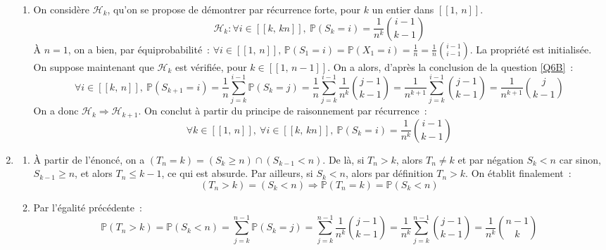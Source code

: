 \documentclass{article}
\newcommand{\prob}{\mathbb{P}}
\begin{document}
\begin{enumerate}[resume]
\begin{enumerate}
      \item On considère $\mathcal{H}_k$, qu'on se propose de démontrer par récurrence forte, pour $k$ un entier dans $[\![1,\, n]\!]$.
      \[
        \mathcal{H}_k \colon \forall i \in [\![k,\, kn]\!],\ \prob(S_k = i) = \frac{1}{n^k}{i - 1 \choose k - 1}
      \]
      À $n = 1$, on a bien, par équiprobabilité~: $\forall i \in [\![1,\, n]\!],\, \prob(S_1 = i) = \prob(X_1 = i) = \frac{1}{n} = \frac{1}{n} {i - 1 \choose i - 1}$. La propriété est initialisée. On suppose maintenant que $\mathcal{H}_k$ est vérifiée, pour $k \in [\![1,\, n-1]\!]$. On a alors, d'après la conclusion de la question \ref{Q6B}~:
      \[
       \forall i \in [\![k,\, n]\!],\ \prob(S_{k+1} = i) = \frac{1}{n} \sum_{j=k}^{i - 1} \prob(S_k = j) = \frac{1}{n} \sum_{j=k}^{i - 1} \frac{1}{n^k}{j - 1 \choose k - 1} = \frac{1}{n^{k+1}} \sum_{j=k}^{i - 1} {j - 1 \choose k - 1}
      = \frac{1}{n^{k+1}}{j \choose k - 1}
      \]
      On a donc $\mathcal{H}_k \Rightarrow \mathcal{H}_{k+1}$. On conclut à partir du principe de raisonnement par récurrence~:
      \[
        \forall k \in [\![1,\, n]\!],\ \forall i \in [\![k,\, kn]\!],\ \prob(S_k = i) = \frac{1}{n^k}{i - 1 \choose k - 1}
      \]
    \end{enumerate}

    \item \begin{enumerate}
      \item À partir de l'énoncé, on a $(T_n = k) = (S_k \geqslant n) \cap (S_{k-1} < n)$. De là, si $T_n > k$, alors $T_n \neq k$ et par négation $S_k < n$ car sinon, $S_{k-1} \geqslant n$, et alors $T_n \leqslant k - 1$, ce qui est absurde. Par ailleurs, si $S_k < n$, alors par définition $T_n > k$. On établit finalement~:
      \[
        (T_n > k) = (S_k < n) \Longrightarrow \prob(T_n = k) = \prob(S_k < n)
      \]

      \item \label{QF} Par l'égalité précédente~:
      \[
        \prob(T_n > k) = \prob(S_k < n) = \sum_{j=k}^{n-1} \prob(S_k = j) = \sum_{j=k}^{n-1} \frac{1}{n^k} {j-1 \choose k - 1} = \frac{1}{n^k} \sum_{j=k}^{n-1} {j-1 \choose k - 1} = \frac{1}{n^k} {n-1 \choose k}
      \]


    \end{enumerate}


\end{enumerate}
\end{document}
